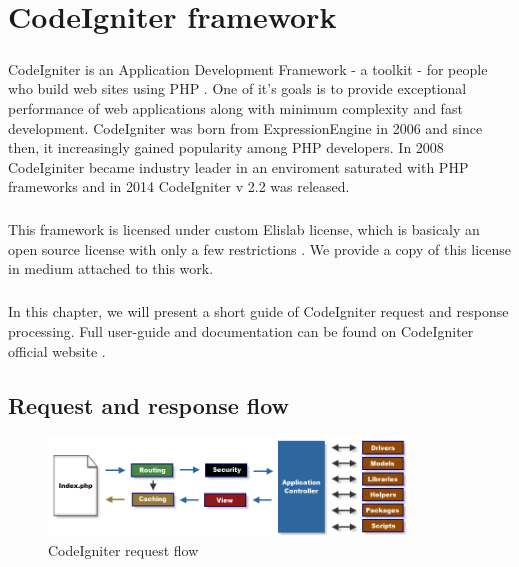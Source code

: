 \chapter{CodeIgniter framework}
\paragraph{}

\paragraph{}
CodeIgniter is an Application Development Framework - a toolkit - for people who build web sites using PHP  \cite{codeigniter}. One of it's goals is to provide exceptional performance of web applications along with minimum complexity and fast development. CodeIgniter was born from ExpressionEngine \cite{elislab} in 2006 and since then, it increasingly gained popularity among PHP developers. In 2008 CodeIginiter became industry leader in an enviroment saturated with PHP frameworks \cite{elislab} and in 2014 CodeIgniter v 2.2 was released.

\paragraph{}
This framework is licensed under custom Elislab license, which is basicaly an open source license with only a few restrictions \cite{elislablicense}. We provide a copy of this license in medium attached to this work.

\paragraph{}
In this chapter, we will present a short guide of CodeIgniter request and response processing. Full user-guide and documentation can be found on CodeIgniter official website \cite{codeigniter}.

\section{Request and response flow}

\begin{figure}[h]
    \centering
    \includegraphics[width=0.85\textwidth]{images/codeigniter.png}
    \caption{CodeIgniter request flow}
    \label{codeigniter_flow}
\end{figure}

